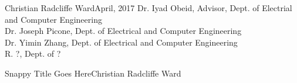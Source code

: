 \documentclass[reqno,12pt,oneside]{report} %
\theoremstyle{plain}
\theoremstyle{definition}
\theoremstyle{remark}
\numberwithin{theorem}{chapter}
\begin{document}

{Christian Radcliffe Ward}{April, 2017}
{Dr. Iyad Obeid, Advisor, Dept. of Electrial and Computer Engineering \\
 Dr. Joseph Picone, Dept. of Electrical and Computer Engineering \\
 Dr. Yimin Zhang, Dept. of Electrical and Computer Engineering \\
 R. ?, Dept. of ? \\
}


\initializefrontsections



\makeatletter
\if@twoside \setcounter{page}{4} \else \setcounter{page}{2} \fi
\makeatother

\startabstractpage
{Snappy Title Goes Here}{Christian Radcliffe Ward}

\label{Abstract}

\startacknowledgementspage

\label{Acknowledgements}


%

\tableofcontents     %
\listoffigures       %
\listoftables        %

\startthechapters
\end{document}
